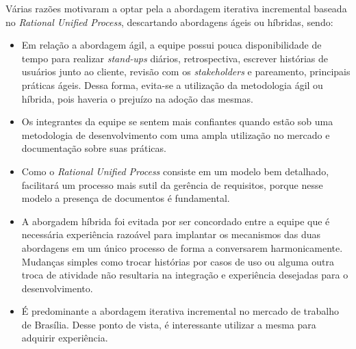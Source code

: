 Várias razões motivaram a optar pela a abordagem iterativa incremental baseada no \textit{Rational Unified Process}, descartando abordagens ágeis ou híbridas, sendo:
\begin{itemize}
\item Em relação a abordagem ágil, a equipe possui pouca disponibilidade de tempo para realizar \textit{stand-ups} diários, retrospectiva, escrever histórias de usuários junto ao cliente, revisão com os \textit{stakeholders} e pareamento, principais práticas ágeis. Dessa forma, evita-se a utilização da metodologia ágil ou híbrida, pois haveria o prejuízo na adoção das mesmas.
\item Os integrantes da equipe se sentem mais confiantes quando estão sob uma metodologia de desenvolvimento com uma ampla utilização no mercado e documentação sobre suas práticas.
\item Como o \textit{Rational Unified Process} consiste em um modelo bem detalhado, facilitará um processo mais sutil da gerência de requisitos, porque nesse modelo a presença de documentos é fundamental.
\item A aborgadem híbrida foi evitada por ser concordado entre a equipe que é necessária experiência razoável para implantar os mecanismos das duas abordagens em um único processo de forma a conversarem harmonicamente. Mudanças simples como trocar histórias por casos de uso ou alguma outra troca de atividade não resultaria na integração e experiência desejadas para o desenvolvimento.
\item É predominante a abordagem iterativa incremental no mercado de trabalho de Brasília. Desse ponto de vista, é interessante utilizar a mesma para adquirir experiência.
\end{itemize}









